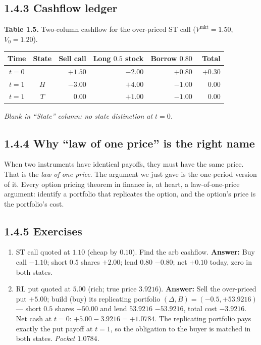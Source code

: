 \documentclass[
  10pt,
  twoside]{book}
\newcounter{none} %
\providecommand{\tightlist}{%
  \setlength{\itemsep}{0pt}\setlength{\parskip}{0pt}}
\begin{document}
\subsection{1.4.3 Cashflow ledger}\label{cashflow-ledger}

\textbf{Table 1.5.} Two-column cashflow for the over-priced ST call
(\(V^{\text{mkt}}=1.50\), \(V_0=1.20\)).

{\def\LTcaptype{none} %
\begin{table}[H]
\centering
\begin{tabular}{|c|c|r|r|r|r|}
\toprule
Time & State & Sell call & Long \(0.5\) stock & Borrow \(0.80\) & Total \\
\midrule



\(t=0\) & & \(+1.50\) & \(-2.00\) & \(+0.80\) & \(+0.30\) \\
\(t=1\) & \(H\) & \(-3.00\) & \(+4.00\) & \(-1.00\) &
\(\phantom{+}0.00\) \\
\(t=1\) & \(T\) & \(\phantom{+}0.00\) & \(+1.00\) & \(-1.00\) &
\(\phantom{+}0.00\) \\
\bottomrule
\end{tabular}
\end{table}
}

\emph{Blank in ``State'' column: no state distinction at \(t=0\).}

\subsection{1.4.4 Why ``law of one price'' is the right
name}\label{why-law-of-one-price-is-the-right-name}

When two instruments have identical payoffs, they must have the same
price. That is the \emph{law of one price}. The argument we just gave is
the one-period version of it. Every option pricing theorem in finance
is, at heart, a law-of-one-price argument: identify a portfolio that
replicates the option, and the option's price is the portfolio's cost.

\subsection{1.4.5 Exercises}\label{exercises-14}

\begin{enumerate}
\def\labelenumi{\arabic{enumi}.}
\tightlist
\item
  ST call quoted at \(1.10\) (cheap by \(0.10\)). Find the arb cashflow.
  \textbf{Answer:} Buy call \(-1.10\); short \(0.5\) shares \(+2.00\);
  lend \(0.80\) \(-0.80\); net \(+0.10\) today, zero in both states.
\item
  RL put quoted at \(5.00\) (rich; true price \(3.9216\)).
  \textbf{Answer:} Sell the over-priced put \(+5.00\); build (buy) its
  replicating portfolio \((\Delta,B)=(-0.5,+53.9216)\) --- short \(0.5\)
  shares \(+50.00\) and lend \(53.9216\) \(-53.9216\), total cost
  \(-3.9216\). Net cash at \(t=0\): \(+5.00 - 3.9216 = +1.0784\). The
  replicating portfolio pays exactly the put payoff at \(t=1\), so the
  obligation to the buyer is matched in both states. \emph{Pocket
  \(1.0784\).}
\end{enumerate}
\end{document}
